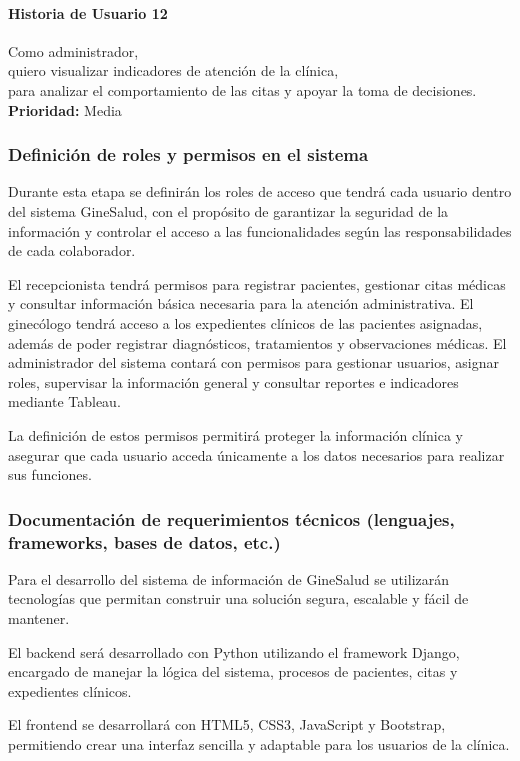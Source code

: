 \documentclass[12pt,letterpaper]{article}
\begin{document}
\paragraph{Historia de Usuario 12}
Como administrador,\\
quiero visualizar indicadores de atención de la clínica,\\
para analizar el comportamiento de las citas y apoyar la toma de decisiones.\\
\textbf{Prioridad:} Media

\subsubsection*{Definición de roles y permisos en el sistema}

Durante esta etapa se definirán los roles de acceso que tendrá cada usuario dentro del
sistema GineSalud, con el propósito de garantizar la seguridad de la información y controlar
el acceso a las funcionalidades según las responsabilidades de cada colaborador.

El recepcionista tendrá permisos para registrar pacientes, gestionar citas médicas y
consultar información básica necesaria para la atención administrativa. El ginecólogo tendrá
acceso a los expedientes clínicos de las pacientes asignadas, además de poder registrar
diagnósticos, tratamientos y observaciones médicas. El administrador del sistema contará
con permisos para gestionar usuarios, asignar roles, supervisar la información general y
consultar reportes e indicadores mediante Tableau.

La definición de estos permisos permitirá proteger la información clínica y asegurar que
cada usuario acceda únicamente a los datos necesarios para realizar sus funciones.

\subsubsection*{Documentación de requerimientos técnicos (lenguajes, frameworks, bases de datos, etc.)}

Para el desarrollo del sistema de información de GineSalud se utilizarán tecnologías que
permitan construir una solución segura, escalable y fácil de mantener.

El backend será desarrollado con Python utilizando el framework Django, encargado de
manejar la lógica del sistema, procesos de pacientes, citas y expedientes clínicos.

El frontend se desarrollará con HTML5, CSS3, JavaScript y Bootstrap, permitiendo crear
una interfaz sencilla y adaptable para los usuarios de la clínica.
\end{document}

